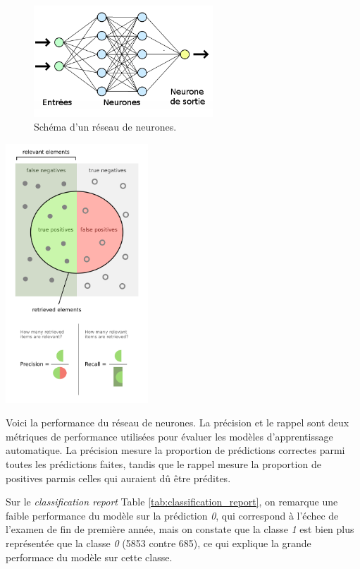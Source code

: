 \documentclass[12pt, letterpaper]{article}
\begin{document}
\begin{figure}[h]
    \centering
    \includegraphics[width=0.6\textwidth]{neural}
    \caption{Schéma d'un réseau de neurones.}
\end{figure}

\includegraphics[width=0.4\textwidth]{precision_recall.png}

Voici la performance du réseau de neurones. La précision et le rappel sont deux métriques de performance utilisées pour 
évaluer les modèles d'apprentissage automatique. La précision mesure la proportion de prédictions correctes parmi 
toutes les prédictions faites, tandis que le rappel mesure la proportion de positives parmis celles qui auraient 
dû être prédites. 

Sur le \emph{classification report} Table \ref{tab:classification_report}, on remarque une faible performance du modèle sur la prédiction \emph{0}, qui correspond à 
l'échec de l'examen de fin de première année, mais on constate que la classe \emph{1} est bien plus représentée 
que la classe \emph{0} (5853 contre 685), ce qui explique la grande performace du modèle sur cette classe.
\end{document}
